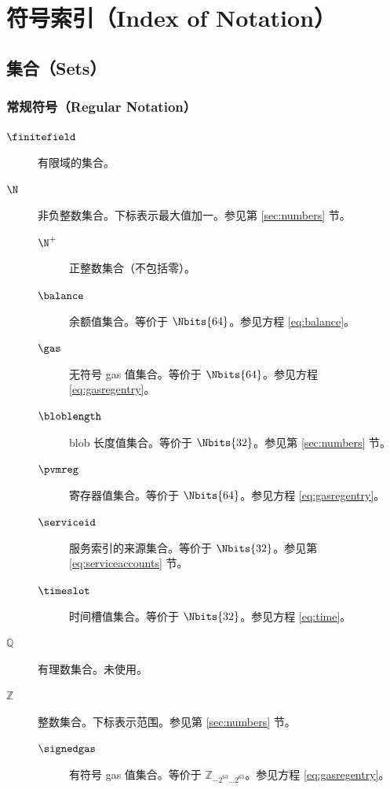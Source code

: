 \section{符号索引（Index of Notation）}\label{sec:definitions}

\subsection{集合（Sets）}

\subsubsection{常规符号（Regular Notation）}
\begin{description}
  \item[$\finitefield$] 有限域的集合。
  \item[$\N$] 非负整数集合。下标表示最大值加一。参见第 \ref{sec:numbers} 节。
  \begin{description}
    \item[$\N^+$] 正整数集合（不包括零）。
    \item[$\balance$] 余额值集合。等价于 $\Nbits{64}$。参见方程 \ref{eq:balance}。
    \item[$\gas$] 无符号 gas 值集合。等价于 $\Nbits{64}$。参见方程 \ref{eq:gasregentry}。
    \item[$\bloblength$] blob 长度值集合。等价于 $\Nbits{32}$。参见第 \ref{sec:numbers} 节。
    \item[$\pvmreg$] 寄存器值集合。等价于 $\Nbits{64}$。参见方程 \ref{eq:gasregentry}。
    \item[$\serviceid$] 服务索引的来源集合。等价于 $\Nbits{32}$。参见第 \ref{eq:serviceaccounts} 节。
    \item[$\timeslot$] 时间槽值集合。等价于 $\Nbits{32}$。参见方程 \ref{eq:time}。
  \end{description}
  \item[$\mathbb{Q}$] 有理数集合。未使用。
  \item[$\mathbb{Z}$] 整数集合。下标表示范围。参见第 \ref{sec:numbers} 节。
  \begin{description}
    \item[$\signedgas$] 有符号 gas 值集合。等价于 $\mathbb{Z}_{-2^{63}\dots2^{63}}$。参见方程 \ref{eq:gasregentry}。
  \end{description}
\end{description}

